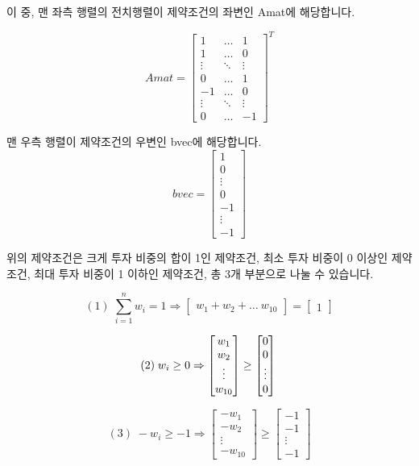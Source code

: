 \documentclass[12pt,]{book}
\begin{document}
이 중, 맨 좌측 행렬의 전치행렬이 제약조건의 좌변인 Amat에 해당합니다.

\[ Amat = \begin{bmatrix}
1 & \dots & 1 \\ 1 & \dots & 0 \\ \vdots & \ddots & \vdots \\
0 & \dots & 1 \\ -1 & \dots & 0 \\ \vdots &  \ddots & \vdots \\
0 &  \dots & -1 \end{bmatrix} ^T \]

맨 우측 행렬이 제약조건의 우변인 bvec에 해당합니다.
\[ bvec = \begin{bmatrix} 1 \\ 0 \\ \vdots \\ 0 \\ -1 \\ \vdots \\ -1 \end{bmatrix} \]

위의 제약조건은 크게 투자 비중의 합이 1인 제약조건, 최소 투자 비중이 0 이상인 제약조건, 최대 투자 비중이 1 이하인 제약조건, 총 3개 부분으로 나눌 수 있습니다.

\[ (1)\; \sum_{i = 1}^nw_i = 1 \Rightarrow \begin{bmatrix} w_1 + w_2 + \dots \ w_{10}  \end{bmatrix} = 
\begin{bmatrix} 1 \end{bmatrix} \]

\[(2)\; w_i \ge 0 \Rightarrow \begin{bmatrix} w_1 \\ w_2 \\ \vdots \\ w_{10}  \end{bmatrix} \ge
\begin{bmatrix} 0 \\ 0 \\ \vdots \\ 0 \end{bmatrix} \\\]

\[(3)\;-w_i \ge -1 \Rightarrow  \begin{bmatrix} -w_1 \\ -w_2 \\ \vdots \\ -w_{10}  \end{bmatrix} \ge \begin{bmatrix} -1 \\ -1 \\ \vdots \\ -1 \end{bmatrix} \]
\end{document}
